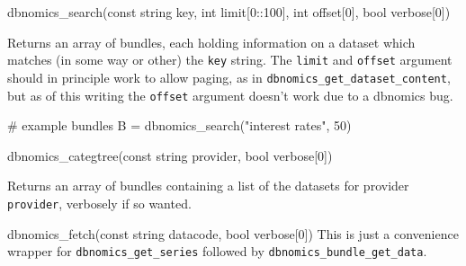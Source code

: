 \documentclass{article}
\begin{document}
\begin{funcdoc}{dbnomics\_search(const string key,
                                 int limit[0::100],
                                 int offset[0],
				 bool verbose[0])}

Returns an array of bundles, each holding information on a dataset
which matches (in some way or other) the \texttt{key} string. The
\texttt{limit} and \texttt{offset} argument should in principle work
to allow paging, as in \texttt{dbnomics\_get\_dataset\_content}, but
as of this writing the \texttt{offset} argument doesn't work due to a
\textsf{dbnomics} bug.
\begin{code}
# example
bundles B = dbnomics_search("interest rates", 50)
\end{code}
\end{funcdoc}
\begin{funcdoc}{dbnomics\_categtree(const string provider,
    bool verbose[0])}

Returns an array of bundles containing a list of the datasets for
provider \texttt{provider}, verbosely if so wanted.

\end{funcdoc}

\begin{funcdoc}{dbnomics\_fetch(const string datacode,
                                bool verbose[0])}
This is just a convenience wrapper for \texttt{dbnomics\_get\_series}
followed by \texttt{dbnomics\_bundle\_get\_data}.
\end{funcdoc}
\end{document}

